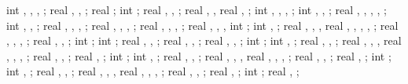 {{int \showshearwall, \shearwallbay, \shearwallstartcolumn, \shearwallendcolumn;
real \shearwallstartx, \shearwallstarty \shearwalldeltax, \shearwalldeltay;
real \shearwalllinet;
int \showmarksuper;
real \marksuperexspace, \marksuperrad, \marksuperlinet;
real \marksuperleftstartx, \marksuperleftstarty,
real \marksuperdeltax, \marksuperdeltay;
int \leftstory, \leftlevel, \rightstory, \rightlevel;
int \leftopenstory, \rightopenstory, \showopenstory;
real \leftwallh, \leftopenh, \rightwallh, \rightopenh, \diffwallh;
int \showphorizontalsprings, \phorspringnumber, \phorspringdir;
real \phorspbtwspr, \phorspringspace, \phorspringstartratio, \phorspringendratio;
real \phortextshiftx, \phortextshifty, \phorprelenratio, \phorpostlenratio;
real \phorsegm, \phorsprwid, \phorsprscale, \phorsprlinethk;
real \phorsuppwidth, \phorsuppdepth, \phorsupplinethk,
int \phorshowsuppshade;
int \showpverticalsprings, \pverspringnumber;
real \pverspringspace, \pverspringstartratio, \pverspringendratio,
real \pvertextshiftx, \pvertextshifty, \pverspringlength, \pverprelenratio, \pverpostlenratio;
real \pverampl, \pversegm, \pverspringscale, \pverspringthk;
real \pversuppwidth, \pversuppdepth, \pversupplinethk;
int \pvershowsuppshade;
int \showpaxialspring;
real \paxialspringlength, \paxialspringprelenratio, \paxialspringpostlenratio;
real \paxialspringsegm, \paxialspringwidth, \paxialspringlinethk;
real \paxialsuppwidth, \paxialsuppdepth, \paxialsupplinethk;
int \paxialshowsuppshade;
int \leftwshowsprings, \leftwspringnumber;
real \leftwspringspace, \leftwspringstartratio, \leftwspringendratio;
real \leftwtextshiftx, \leftwtextshifty, \leftwspringlength,
real \leftwprelenratio, \leftwpostlenratio, \leftwampl, \leftwsegm;
real \leftwspringscale, \leftwspringthk, \leftwsuppwidth;
real \leftwsuppdepth, \leftwsupplinethk;
int \leftwshowsuppshade;
int \rightwshowsprings, \rightwspringnumber;
real \rightwspringspace, \rightwspringstartratio, \rightwspringendratio;
real \rightwtextshiftx, \rightwtextshifty, \rightwspringlength,
real \rightwprelenratio, \rightwpostlenratio, \rightwampl, \rightwsegm;
real \rightwspringscale, \rightwspringthk, \rightwsuppwidth;
real \rightwsuppdepth, \rightwsupplinethk;
int \rightwshowsuppshade;
int \foundshowsprings, \foundspringnumber;
real \foundspringspace, \foundspringstartratio, \foundspringendratio;
real \foundtextshiftx, \foundtextshifty, \foundspringlength,
real \foundprelenratio, \foundpostlenratio, \foundampl, \foundsegm;
real \foundspringscale, \foundspringthk, \foundsuppwidth;
real \foundsuppdepth, \foundsupplinethk;
int \foundshowsuppshade;
real \pinnedy, \aaa;
}}
